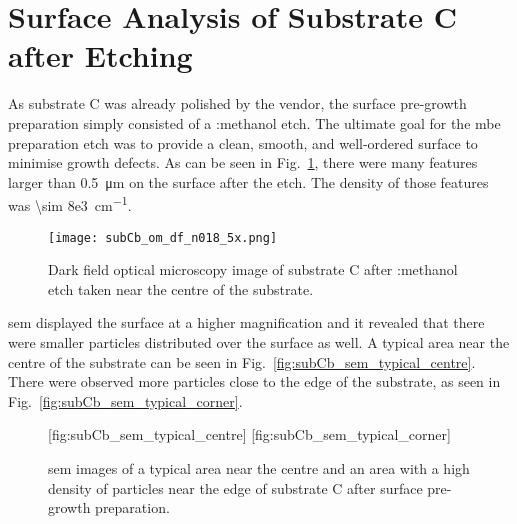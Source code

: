 \clearpage

\section{Surface Analysis of Substrate C after Etching}
As substrate C was already polished by the vendor, the surface pre-growth preparation simply consisted of a :methanol etch. The ultimate goal for the \ac{mbe} preparation etch was to provide a clean, smooth, and well-ordered surface to minimise growth defects. As can be seen in Fig.~\ref{fig:subCb_om_df}, there were many features larger than \SI{0.5}{\micro\metre} on the surface after the etch. The density of those features was \SI{\sim 8e3}{\centi\metre^{-1}}. 

\begin{figure}[htbp]
    \centering
    \texttt{[image: subCb\_om\_df\_n018\_5x.png]}
    \caption[Dark field optical microscopy image of substrate C after :methanol etch.]{Dark field optical microscopy image of substrate C after :methanol etch taken near the centre of the substrate.}\label{fig:subCb_om_df}
\end{figure}

\Ac{sem} displayed the surface at a higher magnification and it revealed that there were smaller particles distributed over the surface as well. A typical area near the centre of the substrate can be seen in Fig.~\ref{fig:subCb_sem_typical_centre}. There were observed more particles close to the edge of the substrate, as seen in Fig.~\ref{fig:subCb_sem_typical_corner}. 

\begin{figure}[htbp]
    [fig:subCb_sem_typical_centre]
    \hfill
    [fig:subCb_sem_typical_corner]
    \caption[\Ac{sem} images of typical areas on substrate C with surface pre-growth preparation.]{\Ac{sem} images of  a typical area near the centre and  an area with a high density of particles near the edge of substrate C after surface pre-growth preparation.}\label{fig:subCb_sem_typical}
\end{figure}

